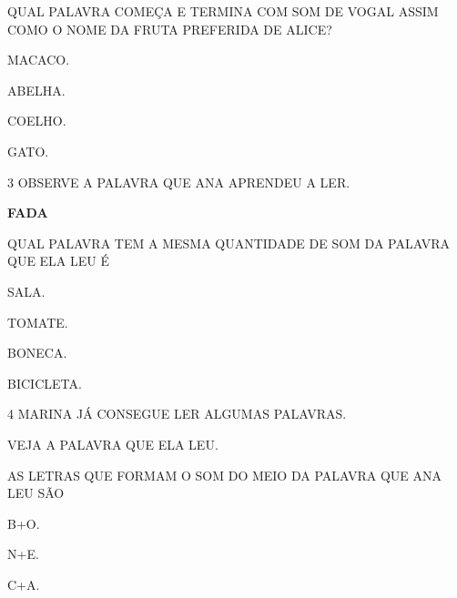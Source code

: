 \begin{escola}
{QUAL PALAVRA COMEÇA E TERMINA COM SOM DE VOGAL ASSIM COMO O NOME DA FRUTA PREFERIDA DE ALICE?

\begin{escolha}
\item MACACO.

\item ABELHA.

\item COELHO.

\item GATO.
\end{escolha}




\num{3} OBSERVE A PALAVRA QUE ANA APRENDEU A LER.

\textbf{FADA}

QUAL PALAVRA TEM A MESMA QUANTIDADE DE SOM DA PALAVRA QUE ELA LEU É

\begin{escolha}
\item SALA.

\item TOMATE.

\item BONECA.

\item BICICLETA.
\end{escolha}




\num{4} MARINA JÁ CONSEGUE LER ALGUMAS PALAVRAS.

VEJA A PALAVRA QUE ELA LEU.


AS LETRAS QUE FORMAM O SOM DO MEIO DA PALAVRA QUE ANA LEU SÃO

\begin{escolha}
\item B+O.

\item N+E.

\item C+A.


\end{escolha}}
\end{escola}
